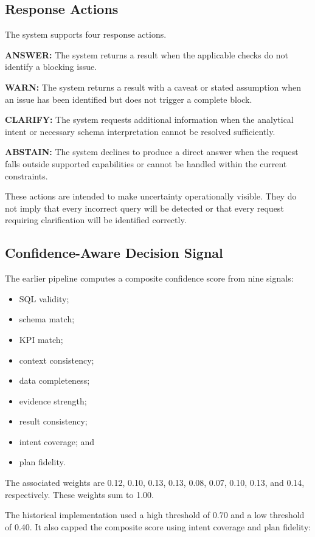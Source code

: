 \documentclass[conference]{IEEEtran}
\providecommand{\tightlist}{\setlength{\itemsep}{0pt}\setlength{\parskip}{0pt}}
\begin{document}
\subsection{Response Actions}

The system supports four response actions.

\textbf{ANSWER:} The system returns a result when the applicable checks do not identify a blocking issue.

\textbf{WARN:} The system returns a result with a caveat or stated assumption when an issue has been identified but does not trigger a complete block.

\textbf{CLARIFY:} The system requests additional information when the analytical intent or necessary schema interpretation cannot be resolved sufficiently.

\textbf{ABSTAIN:} The system declines to produce a direct answer when the request falls outside supported capabilities or cannot be handled within the current constraints.

These actions are intended to make uncertainty operationally visible. They do not imply that every incorrect query will be detected or that every request requiring clarification will be identified correctly.

\subsection{Confidence-Aware Decision Signal}

The earlier pipeline computes a composite confidence score from nine signals:

\begin{itemize}
\tightlist
\item
  SQL validity;
\item
  schema match;
\item
  KPI match;
\item
  context consistency;
\item
  data completeness;
\item
  evidence strength;
\item
  result consistency;
\item
  intent coverage; and
\item
  plan fidelity.
\end{itemize}

The associated weights are 0.12, 0.10, 0.13, 0.13, 0.08, 0.07, 0.10, 0.13, and 0.14, respectively. These weights sum to 1.00.

The historical implementation used a high threshold of 0.70 and a low threshold of 0.40. It also capped the composite score using intent coverage and plan fidelity:
\end{document}
